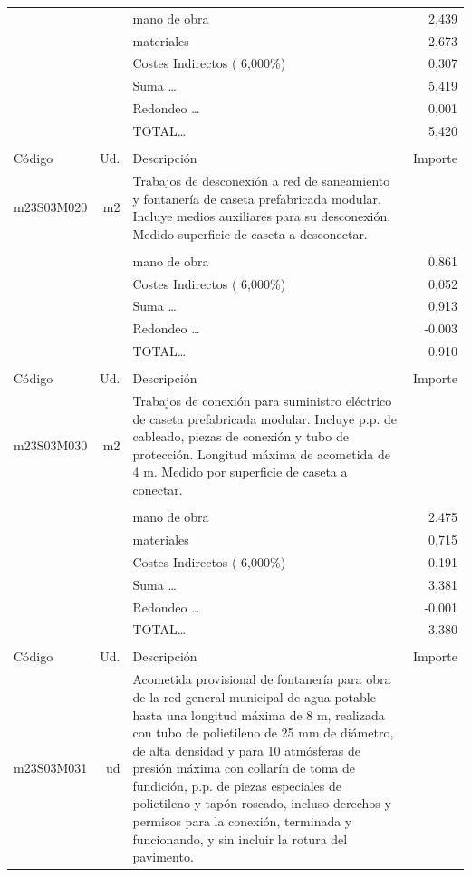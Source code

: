 \begin{supertabular}{l r p{60mm} r}
&&mano de obra&     2,439\\%
&&materiales&     2,673\\%
&&Costes Indirectos (     6,000\%)&     0,307\\%
&&Suma \ldots&     5,419\\%
&&Redondeo \ldots&     0,001\\%
%
&&TOTAL\ldots&     5,420\\%
&&&\\%
Código&Ud.&Descripción&Importe\\%
\hline%
m23S03M020&m2&Trabajos de desconexión a red de saneamiento y fontanería de caseta prefabricada modular. Incluye medios auxiliares para su desconexión. Medido superficie de caseta a desconectar.&\\%
&&&\\%
&&mano de obra&     0,861\\%
&&Costes Indirectos (     6,000\%)&     0,052\\%
&&Suma \ldots&     0,913\\%
&&Redondeo \ldots&    {-}0,003\\%
%
&&TOTAL\ldots&     0,910\\%
&&&\\%
Código&Ud.&Descripción&Importe\\%
\hline%
m23S03M030&m2&Trabajos de conexión para suministro eléctrico de caseta prefabricada modular. Incluye p.p. de cableado, piezas de conexión y tubo de protección. Longitud máxima de acometida de 4 m. Medido por superficie de caseta a conectar.&\\%
&&&\\%
&&mano de obra&     2,475\\%
&&materiales&     0,715\\%
&&Costes Indirectos (     6,000\%)&     0,191\\%
&&Suma \ldots&     3,381\\%
&&Redondeo \ldots&    {-}0,001\\%
%
&&TOTAL\ldots&     3,380\\%
&&&\\%
Código&Ud.&Descripción&Importe\\%
\hline%
m23S03M031&ud&Acometida provisional de fontanería para obra de la red general municipal de agua potable hasta una longitud máxima de 8 m, realizada con tubo de polietileno de 25 mm de diámetro, de alta densidad y para 10 atmósferas de presión máxima con collarín de toma de fundición, p.p. de piezas especiales de polietileno y tapón roscado, incluso derechos y permisos para la conexión, terminada y funcionando, y sin incluir la rotura del pavimento.&\\%

\end{supertabular}
